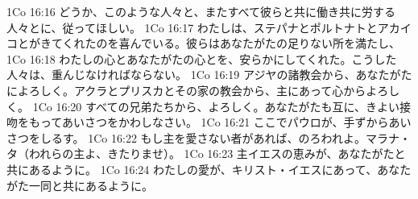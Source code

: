 1Co 16:16  どうか、このような人々と、またすべて彼らと共に働き共に労する人々とに、従ってほしい。
1Co 16:17  わたしは、ステパナとポルトナトとアカイコとがきてくれたのを喜んでいる。彼らはあなたがたの足りない所を満たし、
1Co 16:18  わたしの心とあなたがたの心とを、安らかにしてくれた。こうした人々は、重んじなければならない。
1Co 16:19  アジヤの諸教会から、あなたがたによろしく。アクラとプリスカとその家の教会から、主にあって心からよろしく。
1Co 16:20  すべての兄弟たちから、よろしく。あなたがたも互に、きよい接吻をもってあいさつをかわしなさい。
1Co 16:21  ここでパウロが、手ずからあいさつをしるす。
1Co 16:22  もし主を愛さない者があれば、のろわれよ。マラナ・タ（われらの主よ、きたりませ）。
1Co 16:23  主イエスの恵みが、あなたがたと共にあるように。
1Co 16:24  わたしの愛が、キリスト・イエスにあって、あなたがた一同と共にあるように。


